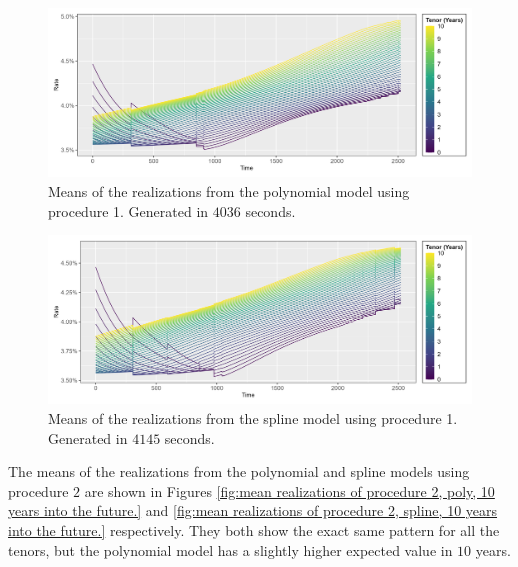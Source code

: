 \begin{figure}[!htbp]
    \centering
    \includegraphics[width=.95\linewidth]{Figures/Simulated Interest Rates/zero_coupon_yields_phase_3_HJM_2F_procedure_1_poly_model_simulated_10Y_mean_small_time_plot.png}
    
    \caption[Mean of the realizations, Polynomial Model, Procedure 1]{Means of the realizations from the polynomial model using procedure 1. Generated in $4036$ seconds.}
    \label{fig:mean realizations of procedure 1, poly, 10 years into the future.}
\end{figure}

\begin{figure}[!htbp]
    \centering
    \includegraphics[width=.95\linewidth]{Figures/Simulated Interest Rates/zero_coupon_yields_phase_3_HJM_2F_procedure_1_spline_model_simulated_10Y_mean_small_time_plot.png}
    
    \caption[Mean of the realizations, Spline Model, Procedure 1]{Means of the realizations from the spline model using procedure 1. Generated in $4145$ seconds.}
    \label{fig:mean realizations of procedure 1, spline, 10 years into the future.}
\end{figure}

\newpage

The means of the realizations from the polynomial and spline models using procedure $2$ are shown in Figures \ref{fig:mean realizations of procedure 2, poly, 10 years into the future.} and \ref{fig:mean realizations of procedure 2, spline, 10 years into the future.} respectively. They both show the exact same pattern for all the tenors, but the polynomial model has a slightly higher expected value in $10$ years.

